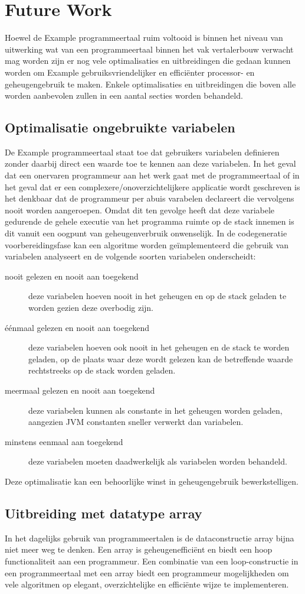 \section{Future Work}
Hoewel de Example programmeertaal ruim voltooid is binnen het niveau van uitwerking wat van een programmeertaal binnen het vak vertalerbouw verwacht mag worden zijn er nog vele optimalisaties en uitbreidingen die gedaan kunnen worden om Example gebruiksvriendelijker en effici\"{e}nter processor- en geheugengebruik te maken. Enkele optimalisaties en uitbreidingen die boven alle worden aanbevolen zullen in een aantal secties worden behandeld.

\subsection{Optimalisatie ongebruikte variabelen}
De Example programmeertaal staat toe dat gebruikers variabelen definieren zonder daarbij direct een waarde toe te kennen aan deze variabelen. In het geval dat een onervaren programmeur aan het werk gaat met de programmeertaal of in het geval dat er een complexere/onoverzichtelijkere applicatie wordt geschreven is het denkbaar dat de programmeur per abuis varabelen declareert die vervolgens nooit worden aangeroepen. Omdat dit ten gevolge heeft dat deze variabele gedurende de gehele executie van het programma ruimte op de stack innemen is dit vanuit een oogpunt van geheugenverbruik onwenselijk. In de codegeneratie voorbereidingsfase kan een algoritme worden ge\"{i}mplementeerd die gebruik van variabelen analyseert en de volgende soorten variabelen onderscheidt:
\begin{description}
\item[nooit gelezen en nooit aan toegekend] deze variabelen hoeven nooit in het geheugen en op de stack geladen te worden gezien deze overbodig zijn.
\item[\'{e}\'{e}nmaal gelezen en nooit aan toegekend] deze variabelen hoeven ook nooit in het geheugen en de stack te worden geladen, op de plaats waar deze wordt gelezen kan de betreffende waarde rechtstreeks op de stack worden geladen.
\item[meermaal gelezen en nooit aan toegekend] deze variabelen kunnen als constante in het geheugen worden geladen, aangezien JVM constanten sneller verwerkt dan variabelen.
\item[minstens eenmaal aan toegekend] deze variabelen moeten daadwerkelijk als variabelen worden behandeld.
\end{description}
Deze optimalisatie kan een behoorlijke winst in geheugengebruik bewerkstelligen.

\subsection{Uitbreiding met datatype array}
In het dagelijks gebruik van programmeertalen is de dataconstructie array bijna niet meer weg te denken. Een array is geheugeneffici\"{e}nt en biedt een hoop functionaliteit aan een programmeur. Een combinatie van een loop-constructie in een programmeertaal met een array biedt een programmeur mogelijkheden om vele algoritmen op elegant, overzichtelijke en effici\"{e}nte wijze te implementeren.
